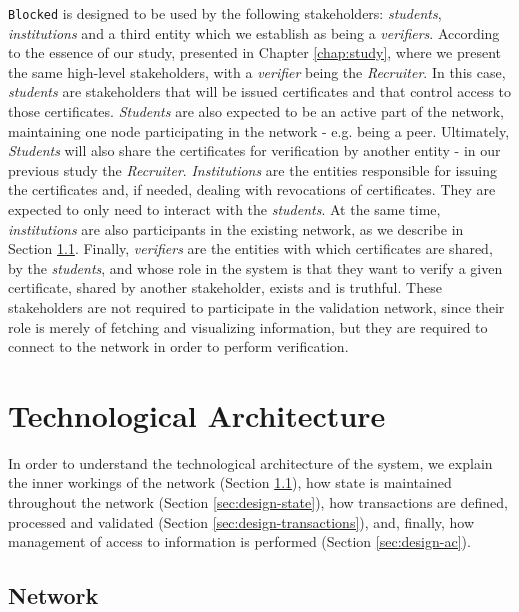 \texttt{Blocked} is designed to be used by the following stakeholders: \textit{students}, \textit{institutions} and a third entity which we establish as being a \textit{verifiers}. According to the essence of our study, presented in Chapter \ref{chap:study}, where we present the same high-level stakeholders, with a \textit{verifier} being the \textit{Recruiter}. In this case, \textit{students} are stakeholders that will be issued certificates and that control access to those certificates. \textit{Students} are also expected to be an active part of the network, maintaining one node participating in the network - e.g. being a peer. Ultimately, \textit{Students} will also share the certificates for verification by another entity - in our previous study the \emph{Recruiter}. \textit{Institutions} are the entities responsible for issuing the certificates and, if needed, dealing with revocations of certificates. They are expected to only need to interact with the \textit{students}. At the same time, \emph{institutions} are also participants in the existing network, as we describe in Section \ref{sec:design-network}. Finally, \emph{verifiers} are the entities with which certificates are shared, by the \textit{students}, and whose role in the system is that they want to verify a given certificate, shared by another stakeholder, exists and is truthful. These stakeholders are not required to participate in the validation network, since their role is merely of fetching and visualizing information, but they are required to connect to the network in order to perform verification.


\section{Technological Architecture}
\label{sec:design-architecture}

In order to understand the technological architecture of the system, we explain the inner workings of the network (Section \ref{sec:design-network}), how state is maintained throughout the network (Section \ref{sec:design-state}), how transactions are defined, processed and validated (Section \ref{sec:design-transactions}), and, finally, how management of access to information is performed (Section \ref{sec:design-ac}).

\subsection{Network}
\label{sec:design-network}

